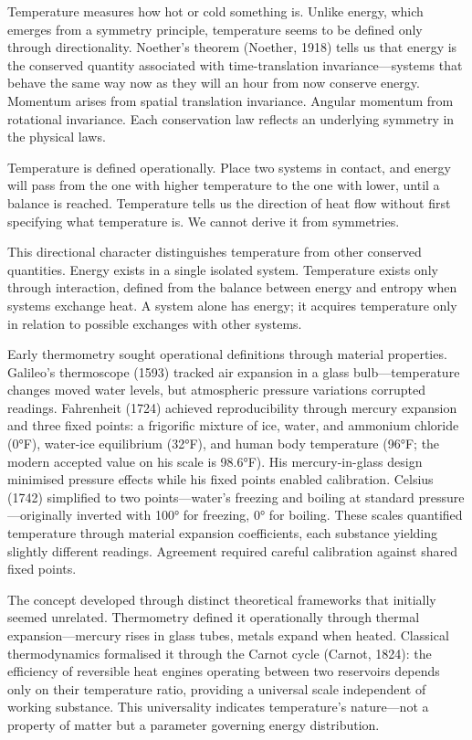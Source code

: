 Temperature measures how hot or cold something is. Unlike energy, which emerges from a symmetry principle, temperature seems to be defined only through directionality. Noether's theorem (Noether, 1918) tells us that energy is the conserved quantity associated with time-translation invariance—systems that behave the same way now as they will an hour from now conserve energy. Momentum arises from spatial translation invariance. Angular momentum from rotational invariance. Each conservation law reflects an underlying symmetry in the physical laws.

Temperature is defined operationally. Place two systems in contact, and energy will pass from the one with higher temperature to the one with lower, until a balance is reached. Temperature tells us the direction of heat flow without first specifying what temperature is. We cannot derive it from symmetries. 

This directional character distinguishes temperature from other conserved quantities. Energy exists in a single isolated system. Temperature exists only through interaction, defined from the balance between energy and entropy when systems exchange heat. A system alone has energy; it acquires temperature only in relation to possible exchanges with other systems.

Early thermometry sought operational definitions through material properties. Galileo's thermoscope (1593) tracked air expansion in a glass bulb—temperature changes moved water levels, but atmospheric pressure variations corrupted readings. Fahrenheit (1724) achieved reproducibility through mercury expansion and three fixed points: a frigorific mixture of ice, water, and ammonium chloride (0°F), water-ice equilibrium (32°F), and human body temperature (96°F; the modern accepted value on his scale is 98.6°F). His mercury-in-glass design minimised pressure effects while his fixed points enabled calibration. Celsius (1742) simplified to two points—water's freezing and boiling at standard pressure—originally inverted with 100° for freezing, 0° for boiling. These scales quantified temperature through material expansion coefficients, each substance yielding slightly different readings. Agreement required careful calibration against shared fixed points.

The concept developed through distinct theoretical frameworks that initially seemed unrelated. Thermometry defined it operationally through thermal expansion—mercury rises in glass tubes, metals expand when heated. Classical thermodynamics formalised it through the Carnot cycle (Carnot, 1824): the efficiency of reversible heat engines operating between two reservoirs depends only on their temperature ratio, providing a universal scale independent of working substance. This universality indicates temperature's nature—not a property of matter but a parameter governing energy distribution.

